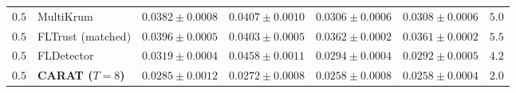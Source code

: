 \begin{table}[!htbp]
{\begin{tabular}{llccccc}
\textbf{$0.5$} & MultiKrum & $0.0382 \pm 0.0008$ & $0.0407 \pm 0.0010$ & $0.0306 \pm 0.0006$ & $0.0308 \pm 0.0006$ & $5.0$ \\
\textbf{$0.5$} & FLTrust (matched) & $0.0396 \pm 0.0005$ & $0.0403 \pm 0.0005$ & $0.0362 \pm 0.0002$ & $0.0361 \pm 0.0002$ & $5.5$ \\
\textbf{$0.5$} & FLDetector & $0.0319 \pm 0.0004$ & $0.0458 \pm 0.0011$ & $0.0294 \pm 0.0004$ & $0.0292 \pm 0.0005$ & $4.2$ \\
\textbf{$0.5$} & \textbf{CARAT ($T=8$)} & $0.0285 \pm 0.0012$ & $0.0272 \pm 0.0008$ & $0.0258 \pm 0.0008$ & $0.0258 \pm 0.0004$ & $2.0$ \\
\bottomrule
\end{tabular}
}
\end{table}
